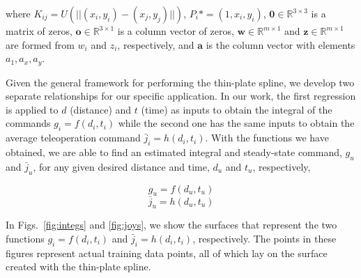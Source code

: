 \documentclass[letterpaper, 10 pt, conference]{ieeeconf}  %
\newcommand\NB[1]{$\spadesuit$\footnote{NB: #1}}
\begin{document}
where $K_{ij} = U(||(x_i,y_i)-(x_j,y_j)||)$, $P_i* = (1,x_i,y_i)$, $\mathbf{0}  \in \mathbb{R}^{3\times3}$ is a matrix of zeros, $\mathbf{o} \in \mathbb{R}^{3\times1}$ is a column vector of zeros, $\mathbf{w} \in \mathbb{R}^{m\times1}$ and $\mathbf{z} \in \mathbb{R}^{m\times1}$ are formed from $w_i$ and $z_i$, respectively, and $\mathbf{a}$ is the column vector with elements $a_1,a_x,a_y$.

Given the general framework for performing the thin-plate spline, we develop two separate relationships for our specific application. In our work, the first regression is applied to $d$ (distance) and $t$ (time) as inputs to obtain the integral of the commands $g_i = f(d_i,t_i)$ while the second one has the same inputs to obtain the average teleoperation command $\bar{j}_i = h(d_i,t_i)$. With the functions we have obtained, we are able to find an estimated integral and steady-state command, $g_u$ and $\bar{j}_u$, for any given desired distance and time, $d_u$ and $t_u$, respectively,

\begin{equation} \label{eq:integralfit}
g_u = f(d_u,t_u)
\end{equation}
\begin{equation} \label{eq:ssvelfit}
\bar{j}_u = h(d_u,t_u)
\end{equation}

In Figs.~\ref{fig:integs} and \ref{fig:joys}, we show the surfaces that represent the two functions $g_i = f(d_i,t_i)$ and $\bar{j}_i = h(d_i,t_i)$, respectively. The points in these figures represent actual training data points, all of which lay on the surface created with the thin-plate spline.
\end{document}
